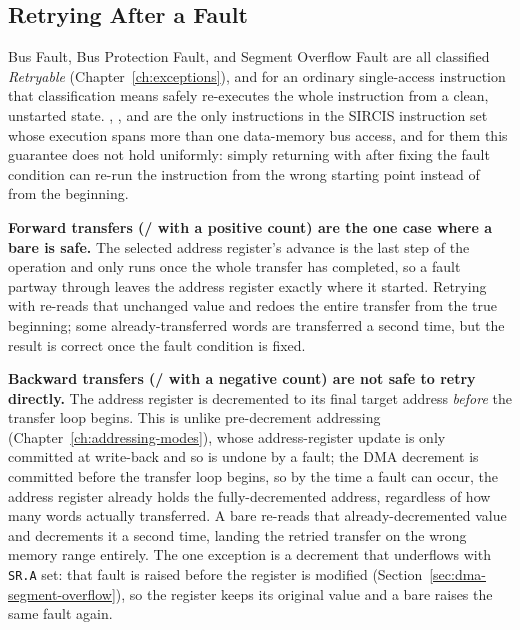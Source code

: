 \subsection{Retrying After a Fault}
\label{sec:dma-fault-retry}

Bus Fault, Bus Protection Fault, and Segment Overflow Fault are all classified \textit{Retryable}
(Chapter~\ref{ch:exceptions}), and for an ordinary single-access instruction that classification means 
safely re-executes the whole instruction from a clean, unstarted state. , , and
 are the only instructions in the SIRCIS instruction set whose execution spans more than one data-memory
bus access, and for them this guarantee does not hold uniformly: simply returning with  after fixing the
fault condition can re-run the instruction from the wrong starting point instead of from the beginning.

\textbf{Forward transfers (/ with a positive count) are the one case where a bare
	 is safe.} The selected address register's advance is the last step of the operation and only runs
once the whole transfer has completed, so a fault partway through leaves the address register exactly where it
started. Retrying with  re-reads that unchanged value and redoes the entire transfer from the true
beginning; some already-transferred words are transferred a second time, but the result is correct once the fault
condition is fixed.

\textbf{Backward transfers (/ with a negative count) are not safe to retry directly.}
The address register is decremented to its final target address \textit{before} the transfer loop begins. This is
unlike pre-decrement addressing (Chapter~\ref{ch:addressing-modes}), whose address-register update is only committed
at write-back and so is undone by a fault; the DMA decrement is committed before the transfer loop begins, so by the
time a fault can occur, the address register already holds the fully-decremented
address, regardless of how many words actually transferred. A bare  re-reads that already-decremented
value and decrements it a second time, landing the retried transfer on the wrong memory range entirely. The one
exception is a decrement that underflows with \texttt{SR.A} set: that fault is raised before the register is modified
(Section~\ref{sec:dma-segment-overflow}), so the register keeps its original value and a bare  raises
the same fault again.

